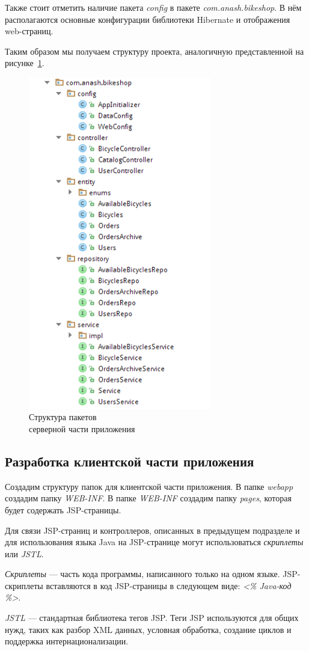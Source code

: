 Также стоит отметить наличие пакета \textit{config} в пакете \textit{com.anash.bikeshop}.
В нём располагаются основные конфигурации библиотеки Hibernate и отображения web-страниц.

Таким образом мы получаем структуру проекта, аналогичную представленной
на рисунке~\ref{fig:project_structure}.

\begin{figure}[h]
  \centering
  \includegraphics[width=80mm]{pic/project_structure.png}
  \caption{Структура пакетов \\ серверной части приложения}
  \label{fig:project_structure}
\end{figure}

\subsection{Разработка клиентской части приложения}

Создадим структуру папок для клиентской части приложения. В папке \textit{webapp}
создадим папку \textit{WEB-INF}. В папке \textit{WEB-INF} создадим папку
\textit{pages}, которая будет содержать JSP-страницы.

Для связи JSP-страниц и контроллеров, описанных в предыдущем подразделе и для
использования языка Java на JSP-странице могут использоваться \textit{скриплеты}
или \textit{JSTL}.

\textit{Скриплеты} --- часть кода программы, написанного только на одном языке.
JSP-скриплеты вставляются в код JSP-страницы в следующем виде:
\textit{<\% Java-код \%>}.

\textit{JSTL} --- стандартная библиотека тегов JSP. Теги JSP используются
для общих нужд, таких как разбор XML данных, условная обработка, создание циклов и
поддержка интернационализации.

\pagebreak
